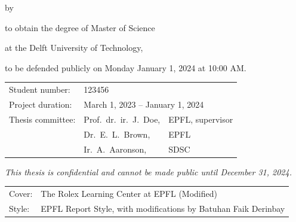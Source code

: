 \begin{titlepage}

\begin{center}

{\makeatletter
\largetitlestyle\fontsize{45}{45}\selectfont\@title
\makeatother}

{\makeatletter
\ifdefvoid{\@subtitle}{}{\bigskip\fontsize{20}{20}\selectfont\@subtitle}
\makeatother}

\bigskip
\bigskip

by

\bigskip
\bigskip

{\makeatletter
\largetitlestyle\fontsize{25}{25}\selectfont\@author
\makeatother}

\bigskip
\bigskip

to obtain the degree of Master of Science

at the Delft University of Technology,

to be defended publicly on Monday January 1, 2024 at 10:00 AM.

\vfill

\begin{tabular}{lll}
    Student number: & 123456 \\
    Project duration: & \multicolumn{2}{l}{March 1, 2023 -- January 1, 2024} \\
    Thesis committee: & Prof.\ dr.\ ir.\ J.\ Doe, & EPFL, supervisor \\
        & Dr.\ E.\ L.\ Brown, & EPFL \\
        & Ir.\ A.\ Aaronson, & SDSC
\end{tabular}

\bigskip
\bigskip
\emph{This thesis is confidential and cannot be made public until December 31, 2024.}

\bigskip
\bigskip
\begin{tabular}{p{15mm}p{10cm}}
    Cover: & The Rolex Learning Center at EPFL (Modified) \\
    Style: & EPFL Report Style, with modifications by Batuhan Faik Derinbay
\end{tabular}


\end{center}
\end{titlepage}
